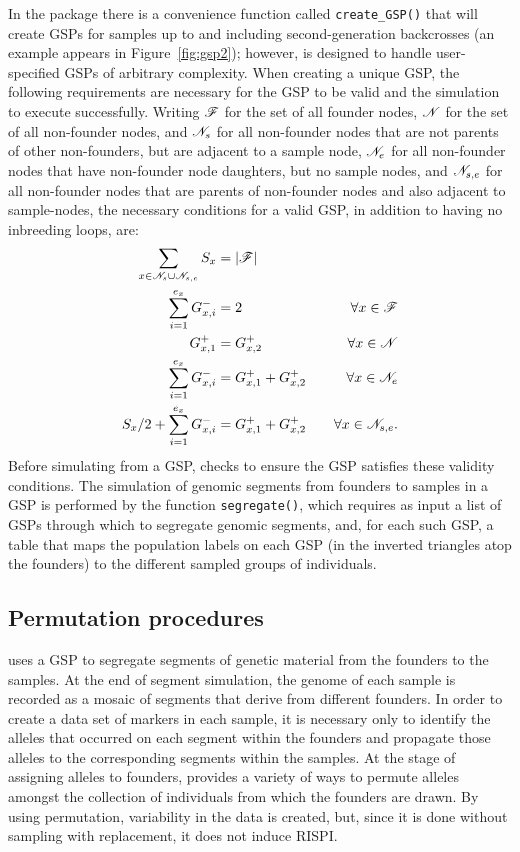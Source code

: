 In the \gscramble{} package there is a convenience function called {\footnotesize\tt create\_GSP()} that
will create GSPs for samples up to and including second-generation backcrosses (an example appears in Figure~\ref{fig:gsp2});
however, \gscramble{} is designed
to handle user-specified GSPs of arbitrary complexity.  When creating a unique GSP,
the following requirements are necessary for the GSP to be valid
and the simulation to execute successfully.
Writing $\mathscr{F}$ for the set of all founder nodes, $\mathscr{N}$ for the set of all non-founder nodes, and $\mathscr{N}_s$ for all non-founder
nodes that are not parents of other non-founders, but are adjacent to a sample node, $\mathscr{N}_e$ for all
non-founder nodes that have non-founder node daughters, but no sample nodes, and $\mathscr{N}_{s,e}$ for all
non-founder nodes that are parents of non-founder nodes and also adjacent to sample-nodes, the necessary conditions
for a valid GSP, in addition to having no inbreeding loops, are:
\begin{equation}
\begin{aligned}
\sum_{x \in \mathscr{N}_s \cup \mathscr{N}_{s,e}} S_x &= |\mathscr{F}| &  \\
\sum_{i=1}^{e_x} G^-_{x,i} &= 2 & \forall x \in \mathscr{F} \\
G^+_{x,1} &= G^+_{x,2} & \forall x \in \mathscr{N} \\
\sum_{i=1}^{e_x} G^-_{x,i} &= G^+_{x,1} +  G^+_{x,2} & \forall x \in \mathscr{N}_e  \\
 S_x/2 + \sum_{i=1}^{e_x} G^-_{x,i} &= G^+_{x,1} +  G^+_{x,2} & ~~~\forall x \in \mathscr{N}_{s,e}.  \\
\end{aligned}
\end{equation}
Before simulating from a GSP, \gscramble{} checks to ensure the GSP
satisfies these validity conditions.  The simulation of genomic segments
from founders to samples in a GSP is performed by the \gscramble{} function
{\footnotesize\tt segregate()}, which requires as input a list of GSPs through which
to segregate genomic segments, and, for each such GSP, a table that maps the
population labels on each GSP (in the inverted triangles atop the founders) to the
different sampled groups of individuals.

\subsection*{Permutation procedures}

\gscramble{} uses a GSP to segregate segments of genetic material from the founders
to the samples.  At the end of segment simulation, the genome of each sample
is recorded as a mosaic of segments that derive from different founders.  In order
to create a data set of markers in each sample, it is necessary only to identify the alleles
that occurred on each segment within the founders and propagate those alleles to the
corresponding segments within the samples.  At the stage of assigning alleles to
founders, \gscramble{} provides a variety of ways to permute alleles amongst
the collection of individuals from which the founders are drawn.  By using permutation,
variability in the data is created, but, since it is done without sampling with replacement, it does
not induce RISPI.

